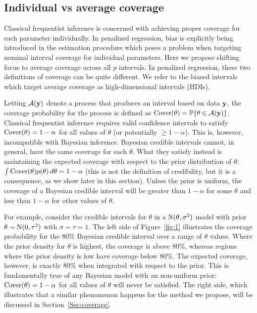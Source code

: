 \subsection{Individual vs average coverage}
\label{Sec:IAC}

Classical frequentist inference is concerned with achieving proper coverage for each parameter individually. In penalized regression, bias is explicitly being introduced in the estimation procedure which poses a problem when targeting nominal interval coverage for individual parameters. Here we propose shifting focus to average coverage across all $p$ intervals. In penalized regression, these two definitions of coverage can be quite different. We refer to the biased intervals which target average coverage as high-dimensional intervals (HDIs).

Letting $\mathcal{A}(\mathbf{y})$ denote a process that produces an interval based on data $\mathbf{y}$, the coverage probability for the process is defined as $\textrm{Cover}(\theta) = \mathbb{P}\{\theta \in \mathcal{A}(\mathbf{y})\}$. Classical frequentist inference requires valid confidence intervals to satisfy $\textrm{Cover}(\theta) = 1 - \alpha$ for all values of $\theta$ (or potentially $\ge 1 - \alpha$). This is, however, incompatible with Bayesian inference. Bayesian credible intervals cannot, in general, have the same coverage for each $\theta$. What they satisfy instead is maintaining the expected coverage with respect to the prior distribution of $\theta$: $\int \textrm{Cover}(\theta)p(\theta) \, d\theta = 1 - \alpha$ (this is not the definition of credibility, but it is a consequence, as we show later in this section). Unless the prior is uniform, the coverage of a Bayesian credible interval will be greater than $1-\alpha$ for some $\theta$ and less than $1-\alpha$ for other values of $\theta$.

For example, consider the credible intervals for $\theta$ in a $\textrm{N}(\theta, \sigma^2)$ model with prior $\theta \sim \textrm{N}(0, \tau^2)$ with $\sigma = \tau = 1$. The left side of Figure~\ref{fig:1} illustrates the coverage probability for the 80\% Bayesian credible interval over a range of $\theta$ values. Where the prior density for $\theta$ is highest, the coverage is above 80\%, whereas regions where the prior density is low have coverage below 80\%. The expected coverage, however, is exactly 80\% when integrated with respect to the prior. This is fundamentally true of any Bayesian model with an non-uniform prior: $\textrm{Cover}(\theta) = 1 - \alpha$ for all values of $\theta$ will never be satisfied. The right side, which illustrates that a similar phenomenon happens for the method we propose, will be discussed in Section~\ref{Sec:coverage}.

